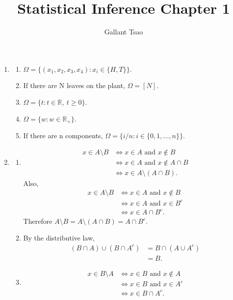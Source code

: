 \documentclass{article}
\title{Statistical Inference Chapter 1}
\author{Gallant Tsao}
\begin{document}
\maketitle

\begin{enumerate}
    \item \begin{enumerate}
        \item $\Omega = \{(x_1, x_2, x_3, x_4): x_i \in \{H, T\}\}.$
        \item If there are N leaves on the plant, $\Omega = [N]$.
        \item $\Omega = \{t: t \in \mathbb{R},\ t \geq 0\}$.
        \item $\Omega = \{w: w \in \mathbb{R}_{+}\}$.
        \item If there are n components, $\Omega = \{i/n: i \in \{0, 1, ..., n\}\}$.
    \end{enumerate}

    \item \begin{enumerate}
        \item \begin{align*}
            x \in A \setminus B
            &\iff x \in A \text{ and } x \notin B \\
            &\iff x \in A \text{ and } x \notin A \cap B \\
            &\iff x \in A \setminus (A \cap B).
        \end{align*}
        Also,
        \begin{align*}
            x \in A \setminus B
            &\iff x \in A \text{ and } x \notin B \\
            &\iff x \in A \text{ and } x \in B^{c} \\
            &\iff x \in A \cap B^{c}.
        \end{align*}
        Therefore $A \setminus B = A \setminus (A \cap B) = A \cap B^{c}$.

        \item By the distributive law, \begin{align*}
            (B \cap A) \cup (B \cap A^{c})
            &= B \cap (A \cup A^c) \\
            &= B.
        \end{align*}

        \item \begin{align*}
            x \in B \setminus A
            &\iff x \in B \text{ and } x \notin A \\
            &\iff x \in B \text{ and } x \in A^c \\
            &\iff x \in B \cap A^c.
        \end{align*}


\end{enumerate}
\end{enumerate}
\end{document}
